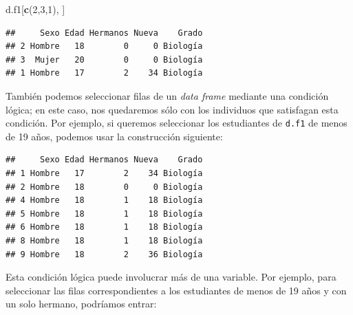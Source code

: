 \documentclass[]{book}
\newenvironment{Shaded}{\begin{snugshade}}{\end{snugshade}}
\newcommand{\DecValTok}[1]{\textcolor[rgb]{0.00,0.00,0.81}{#1}}
\newcommand{\KeywordTok}[1]{\textcolor[rgb]{0.13,0.29,0.53}{\textbf{#1}}}
\newcommand{\NormalTok}[1]{#1}
\newcommand{\OperatorTok}[1]{\textcolor[rgb]{0.81,0.36,0.00}{\textbf{#1}}}
\newcommand{\StringTok}[1]{\textcolor[rgb]{0.31,0.60,0.02}{#1}}
\theoremstyle{definition}
\theoremstyle{definition}
\theoremstyle{definition}
\theoremstyle{remark}
\begin{document}
\begin{Shaded}
\begin{Highlighting}[]
\NormalTok{d.f1[}\KeywordTok{c}\NormalTok{(}\DecValTok{2}\NormalTok{,}\DecValTok{3}\NormalTok{,}\DecValTok{1}\NormalTok{), ]}
\end{Highlighting}
\end{Shaded}

\begin{verbatim}
##     Sexo Edad Hermanos Nueva    Grado
## 2 Hombre   18        0     0 Biología
## 3  Mujer   20        0     0 Biología
## 1 Hombre   17        2    34 Biología
\end{verbatim}

También podemos seleccionar filas de un \emph{data frame} mediante una condición lógica; en este caso, nos quedaremos sólo con los individuos que satisfagan esta condición. Por ejemplo, si queremos seleccionar los estudiantes de \texttt{d.f1} de menos de 19 años, podemos usar la construcción siguiente:

\begin{Shaded}
\end{Shaded}

\begin{verbatim}
##     Sexo Edad Hermanos Nueva    Grado
## 1 Hombre   17        2    34 Biología
## 2 Hombre   18        0     0 Biología
## 4 Hombre   18        1    18 Biología
## 5 Hombre   18        1    18 Biología
## 6 Hombre   18        1    18 Biología
## 8 Hombre   18        1    18 Biología
## 9 Hombre   18        2    36 Biología
\end{verbatim}

Esta condición lógica puede involucrar más de una variable. Por ejemplo, para seleccionar las filas correspondientes a los estudiantes de menos de 19 años y con un solo hermano, podríamos entrar:

\begin{Shaded}
\end{Shaded}
\end{document}
